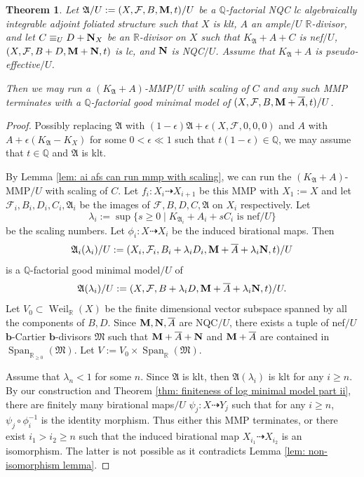 \documentclass[12pt]{amsart}
\numberwithin{equation}{section}
\newcommand{\bb}{\bm{b}}
\newcommand{\Mm}{{\bf{M}}}
\newcommand{\Nn}{{\bf{N}}}
\newcommand{\Rr}{\mathbb{R}}
\newcommand{\Span}{\operatorname{Span}}
\newcommand{\Weil}{\operatorname{Weil}}
\newcommand{\Aa}{{\mathfrak{A}}}
\newcommand{\Ff}{\mathcal{F}}
\newcommand{\MM}{{\mathfrak{M}}}
\newtheorem{thm}{Theorem}[section]
\theoremstyle{definition}
\theoremstyle{definition}
\theoremstyle{definition}
\begin{document}
\begin{thm}\label{thm: nqc mmp with scaling posssible not ample}
  Let $\Aa/U:=(X,\Ff,B,\Mm,t)/U$ be a $\mathbb Q$-factorial NQC lc algebraically integrable adjoint foliated structure such that $X$ is klt, $A$ an ample$/U$ $\Rr$-divisor, and let $C\equiv_U D+\Nn_X$ be an $\Rr$-divisor on $X$ such that $K_{\Aa}+A+C$ is nef$/U$, $(X,\Ff,B+D,\Mm+\Nn,t)$ is lc, and $\Nn$ is NQC$/U$. Assume that $K_{\Aa}+A$ is pseudo-effective$/U$.
  
  Then we may run a $(K_{\Aa}+A)$-MMP$/U$ with scaling of $C$ and any such MMP terminates with a $\mathbb Q$-factorial good minimal model of $(X,\Ff,B,\Mm+\overline{A},t)/U$.
\end{thm}
\begin{proof}
Possibly replacing $\Aa$ with $(1-\epsilon)\Aa+\epsilon(X,\Ff,0,0,0)$
and $A$ with $A+\epsilon(K_{\Aa}-K_{X})$ for some $0<\epsilon\ll 1$ such that $t(1-\epsilon)\in\mathbb Q$, we may assume that $t\in\mathbb Q$ and $\Aa$ is klt. 

    By Lemma \ref{lem: ai afs can run mmp with scaling}, we can run the $(K_{\Aa}+A)$-MMP$/U$ with scaling of $C$. Let $f_i: X_i\dashrightarrow X_{i+1}$ be this MMP with $X_1:=X$ and let $\Ff_i,B_i,D_i,C_i,\Aa_i$ be the images of $\Ff,B,D,C,\Aa$ on $X_i$ respectively. Let
    $$\lambda_i:=\sup\{s\geq 0\mid K_{\Aa_i}+A_i+sC_i\text{ is nef}/U\}$$
    be the scaling numbers. Let $\phi_i: X\dashrightarrow X_i$ be the induced birational maps. Then $$\Aa_{i}(\lambda_i)/U:=(X_i,\Ff_i,B_i+\lambda_iD_i,\Mm+\overline{A}+\lambda_i\Nn,t)/U$$
    is a $\mathbb Q$-factorial good minimal model$/U$ of $$\Aa(\lambda_i)/U:=(X,\Ff,B+\lambda_i D,\Mm+\overline{A}+\lambda_i\Nn,t)/U.$$
    Let $V_0\subset\Weil_{\mathbb R}(X)$ be the finite dimensional vector subspace spanned by all the components of $B,D$. Since $\Mm,\Nn,\overline{A}$ are NQC$/U$, there exists a tuple of nef$/U$ $\bb$-Cartier $\bb$-divisors $\MM$ such that $\Mm+\overline{A}+\Nn$ and $\Mm+\overline{A}$ are contained in $\Span_{\mathbb R_{\geq 0}}(\MM)$. Let $V:=V_0\times\Span_{\mathbb R}(\MM)$.

    Assume that $\lambda_n<1$ for some $n$. Since $\Aa$ is klt, then $\Aa(\lambda_i)$ is klt for any $i\geq n$. By our construction and Theorem \ref{thm: finiteness of log minimal model part ii}, there are finitely many birational maps$/U$ $\psi_j: X\dashrightarrow Y_j$ such that for any $i\geq n$, $\psi_j\circ\phi_i^{-1}$ is the identity morphism. Thus either this MMP terminates, or there exist $i_1>i_2\geq n$ such that the induced birational map $X_{i_1}\dashrightarrow X_{i_2}$ is an isomorphism. The latter is not possible as it contradicts Lemma \ref{lem: non-isomorphism lemma}.
   


\end{proof}
\end{document}
